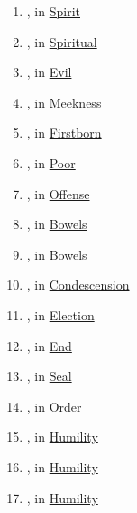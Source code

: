 \begin{enumerate}
		\item \hyperref[PNEUMA]{}, in \hyperref[SPIRIT]{Spirit}
		
		\item \hyperref[PNEUMATIKOS]{}, in \hyperref[SPIRITUAL]{Spiritual}
		
		\item \hyperref[PONEROS]{}, in \hyperref[EVIL]{Evil}
		
		\item \hyperref[PRAUS]{}, in \hyperref[MEEKNESS]{Meekness}
		
		\item \hyperref[PROTOTOKOS]{}, in \hyperref[FIRSTBORN]{Firstborn}
		
		\item \hyperref[PTOCHOS]{}, in \hyperref[POOR]{Poor}
		
		\item \hyperref[SKANDALIZO]{}, in \hyperref[OFFENSE]{Offense}
		
		\item \hyperref[SPLANCHNIZO]{}, in \hyperref[BOWELS]{Bowels}
		
		\item \hyperref[SPLANCHNON]{}, in \hyperref[BOWELS]{Bowels}
		
		\item \hyperref[SUNAPAGO]{}, in \hyperref[CONDESCENSION]{Condescension}
		
		\item \hyperref[SUNEKLEKTOS]{}, in \hyperref[ELECTION]{Election}
		
		\item \hyperref[SUNTELEIA]{}, in \hyperref[END]{End}
		
		\item \hyperref[SPHRAGIZO]{}, in \hyperref[SEAL]{Seal}
		
		\item \hyperref[TAXIS]{}, in \hyperref[ORDER]{Order}
		
		\item \hyperref[TAPEINOPHROSUNE]{}, in \hyperref[HUMILITY]{Humility}
		
		\item \hyperref[TAPEINOS]{}, in \hyperref[HUMILITY]{Humility}
		
		\item \hyperref[TAPEINOO]{}, in \hyperref[HUMILITY]{Humility}
		

\end{enumerate}
